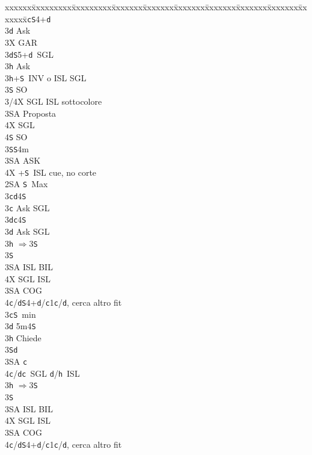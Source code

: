 \documentclass[a4paper,italian]{article}
\newcommand{\BS}{\small{\texttt{S}}}
\newcommand{\BC}{\small{\texttt{c}}}
\newcommand{\BD}{\small{\texttt{d}}}
\newcommand{\BH}{\small{\texttt{h}}}
\newenvironment{bidtable}
{\begin{tabbing}

    xxxxxx\=xxxxxxxxx\=xxxxxxxxx\=xxxxxxx\=xxxxxxx\=xxxxxxx\=xxxxxxx\=xxxxxxx\=xxxxxxx\=xxxxxxx\=\kill}
{\end{tabbing} }%
\begin{document}
\begin{multicols}{2}
\begin{bidtable}
        3\BC {}\BS 4+\BD \+\\
        3\BD \> Ask\+\\
        3X \> GAR\-\-\\
        3\BD {}\BS 5+\BD\ SGL\+\\
        3\BH \> Ask\-\\
        3\BH {}+\BS\ INV o ISL SGL\+\\
        3\BS \> SO\+\\
        3/4X \> SGL ISL sottocolore\-\\
        3\small{SA} \> Proposta\+\\
        4X \> SGL\\
        4\BS \> SO\-\-\\
        3\BS {}\BS 4m\+\\
        3\small{SA} \> ASK\-\\
        4X +\BS\ ISL cue, no corte\-\\
        2\small{SA} \BS\ Max\+\\
        3\BC {}\BD 4\BS \+\\
        3\BC \> Ask SGL\-\\
        3\BD {}\BC 4\BS \+\\
        3\BD \> Ask SGL\-\\
        3\BH \> $\Rightarrow$3\BS\+\\
        3\BS\+\\
        3\small{SA} \> ISL BIL\\
        4X \> SGL ISL\-\-\\
        3\small{SA} \> COG\\
        4\BC/\BD {}\BS4+\BD/\BC1\BC/\BD, cerca altro fit \-\\
        3\BC {}\BS\ min\+\\
        3\BD \> 5m4\BS \+\\
        3\BH \> Chiede\+\\
        3\BS {}\BD \\
        3\small{SA} \BC \\
        4\BC/\BD {}\BC\ SGL \BD /\BH\ ISL \-\-\\
        3\BH \> $\Rightarrow$3\BS\+\\
        3\BS\+\\
        3\small{SA} \> ISL BIL\\
        4X \> SGL ISL\-\-\\
        3\small{SA} \> COG\\
        4\BC/\BD {}\BS4+\BD/\BC1\BC/\BD, cerca altro fit \-\\

\end{bidtable}
\end{multicols}
\end{document}

